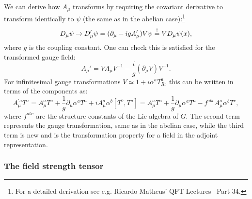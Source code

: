 We can derive how $A_\mu$ transforms by requiring the covariant derivative to transform identically to $\psi$ (the same as in the abelian case):\footnote{For a detailed derivation see e.g. Ricardo Matheus' QFT Lectures~\cite{MatheusQFT} Part 34.}
\begin{equation}
	\label{eq:01_qft_gt_yangmills_dmu_transformation}
	D_\mu\psi \rightarrow D'_\mu\psi = (\partial_\mu - igA_\mu')V\psi \overset{!}{=} VD_\mu\psi(x),
\end{equation}
where $g$ is the coupling constant.
One can check this is satisfied for the transformed gauge field:
\begin{equation}
	\label{eq:01_qft_gt_yangmills_gauge_transformation_A}
	 A_\mu' = V A_\mu V^{-1} - \frac{i}{g}(\partial_\mu V)V^{-1}.
\end{equation}
For infinitesimal gauge transformations $V \simeq 1 + i\alpha^aT_R^a$, this can be written in terms of the components as:
\begin{equation}
	\label{eq:01_qft_gt_yangmills_gauge_transformation_A_infinitesimal}
	 A_\mu^{'a}T^a = A_\mu^aT^a + \frac{1}{g}\partial_\mu\alpha^aT^a + i A_\mu^a\alpha^b[T^b, T^a] = A_\mu^aT^a + \frac{1}{g}\partial_\mu\alpha^aT^a - f^{abc}A_\mu^a\alpha^bT^c,
\end{equation}
where $f^{abc}$ are the structure constants of the Lie algebra of $G$.
The second term represents the gauge transformation, same as in the abelian case, while the third term is new and is the transformation property for a field in the adjoint representation.

\subsubsection{The field strength tensor}

